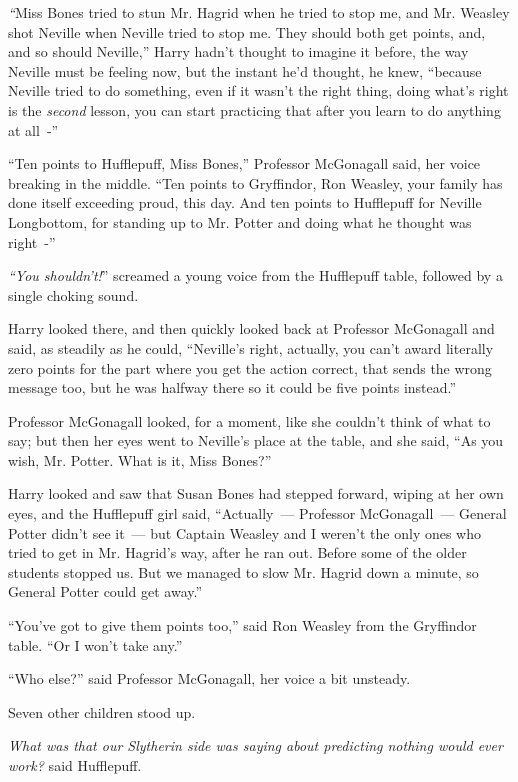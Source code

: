 \emph{``}Miss Bones tried to stun Mr. Hagrid when he tried to stop me, and Mr. Weasley shot Neville when Neville tried to stop me. They should both get points, and, and so should Neville,'' Harry hadn't thought to imagine it before, the way Neville must be feeling now, but the instant he'd thought, he knew, ``because Neville tried to do something, even if it wasn't the right thing, doing what's right is the \emph{second} lesson, you can start practicing that after you learn to do anything at all~-''

``Ten points to Hufflepuff, Miss Bones,'' Professor McGonagall said, her voice breaking in the middle. ``Ten points to Gryffindor, Ron Weasley, your family has done itself exceeding proud, this day. And ten points to Hufflepuff for Neville Longbottom, for standing up to Mr. Potter and doing what he thought was right~-''

\emph{``You shouldn't!}'' screamed a young voice from the Hufflepuff table, followed by a single choking sound.

Harry looked there, and then quickly looked back at Professor McGonagall and said, as steadily as he could, ``Neville's right, actually, you can't award literally zero points for the part where you get the action correct, that sends the wrong message too, but he was halfway there so it could be five points instead.''

Professor McGonagall looked, for a moment, like she couldn't think of what to say; but then her eyes went to Neville's place at the table, and she said, ``As you wish, Mr. Potter. What is it, Miss Bones?''

Harry looked and saw that Susan Bones had stepped forward, wiping at her own eyes, and the Hufflepuff girl said, ``Actually~--- Professor McGonagall~--- General Potter didn't see it~--- but Captain Weasley and I weren't the only ones who tried to get in Mr. Hagrid's way, after he ran out. Before some of the older students stopped us. But we managed to slow Mr. Hagrid down a minute, so General Potter could get away.''

``You've got to give them points too,'' said Ron Weasley from the Gryffindor table. ``Or I won't take any.''

``Who else?'' said Professor McGonagall, her voice a bit unsteady.

Seven other children stood up.

\emph{What was that our Slytherin side was saying about predicting nothing would ever work?} said Hufflepuff.


